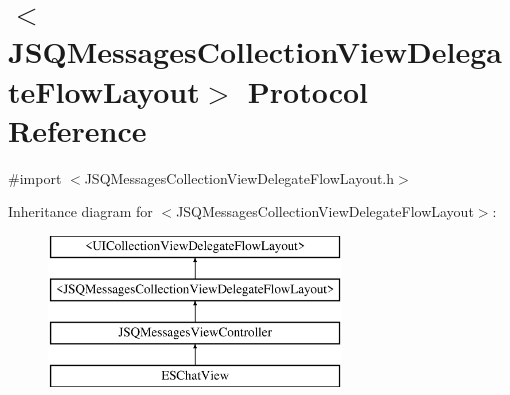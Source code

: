 \hypertarget{protocol_j_s_q_messages_collection_view_delegate_flow_layout-p}{}\section{$<$J\+S\+Q\+Messages\+Collection\+View\+Delegate\+Flow\+Layout$>$ Protocol Reference}
\label{protocol_j_s_q_messages_collection_view_delegate_flow_layout-p}


{\ttfamily \#import $<$J\+S\+Q\+Messages\+Collection\+View\+Delegate\+Flow\+Layout.\+h$>$}

Inheritance diagram for $<$J\+S\+Q\+Messages\+Collection\+View\+Delegate\+Flow\+Layout$>$\+:\begin{figure}[H]
\begin{center}
\leavevmode
\includegraphics[height=4.000000cm]{protocol_j_s_q_messages_collection_view_delegate_flow_layout-p}
\end{center}
\end{figure}
